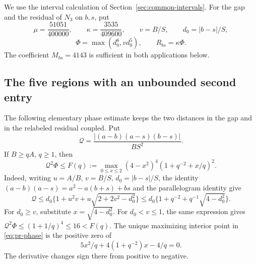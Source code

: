 \documentclass[12pt]{article}
\numberwithin{equation}{section}
\begin{document}
We use the interval calculation of Section~\ref{sec:common-intervals}.
For the gap and the residual of $N_3$ on $b,s$, put
\[
 \mu=\frac{51051}{400000},\qquad \kappa=\frac{3535}{409600},\qquad
 v=B/S,\qquad d_0=|b-s|/S,
\]
\[
 \Phi=\max(d_0^6,vd_0^5),\qquad R_{bs}=\kappa\Phi.
\]
The coefficient $M_{bs}=4143$ is sufficient in both applications below.

\subsection{The five regions with an unbounded second entry}

The following elementary phase estimate keeps the two distances in the
gap and in the relabeled residual coupled. Put
\[
 \mathcal Q=\frac{|(a-b)(a-s)(b-s)|}{BS^2}.
\]
If \(B\ge qA\), \(q\ge1\), then
\begin{equation}\label{eq:pr-phase}
 \mathcal Q^2\Phi\le
 F(q):=\max_{0\le x\le2}(4-x^2)^4(1+q^{-2}+x/q)^2.
\end{equation}
Indeed, writing \(u=A/B\), \(v=B/S\), \(d_0=|b-s|/S\), the identity
\((a-b)(a-s)=a^2-a(b+s)+bs\) and the parallelogram identity give
\[
 \mathcal Q\le d_0\{1+u^2v+u\sqrt{2+2v^2-d_0^2}\}
 \le d_0\{1+q^{-2}+q^{-1}\sqrt{4-d_0^2}\}.
\]
For \(d_0\ge v\), substitute \(x=\sqrt{4-d_0^2}\).
For \(d_0<v\le1\), the same expression gives
\(\mathcal Q^2\Phi\le(1+1/q)^4\le16<F(q)\).
The unique maximizing interior point in \eqref{eq:pr-phase} is the
positive zero of
\begin{equation}\label{eq:pr-phase-critical}
 5x^2/q+4(1+q^{-2})x-4/q=0.
\end{equation}
The derivative changes sign there from positive to negative.
\end{document}
